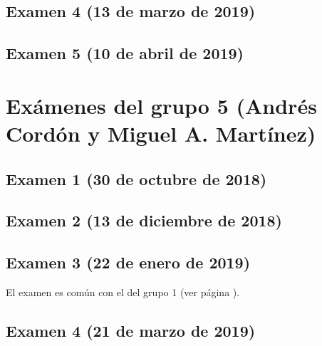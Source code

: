 \documentclass[a4paper,12pt,twoside]{book}
\begin{document}
\subsection{Examen 4 (13 de marzo de 2019)}
\subsection{Examen 5 (10 de abril de 2019)}
        
\section{Exámenes del grupo 5 (Andrés Cordón y
                                                  Miguel A. Martínez)}
\subsection{Examen 1 (30 de octubre de 2018)}
\subsection{Examen 2 (13 de diciembre de 2018)}
\subsection{Examen 3 (22 de enero de 2019)}
El examen es común con el del grupo 1 (ver página \pageref{examen_18_19_1_3}).
\subsection{Examen 4 (21 de marzo de 2019)}
\end{document}
